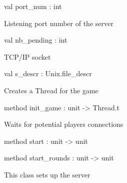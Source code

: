 \documentclass[11pt]{article}
\begin{document}
\begin{ocamldocobjectend}


\label{val:Server.server.port-underscorenum}\begin{ocamldoccode}
val port_num : int
\end{ocamldoccode}
\begin{ocamldocdescription}
Listening port number of the server


\end{ocamldocdescription}


\label{val:Server.server.nb-underscorepending}\begin{ocamldoccode}
val nb_pending : int
\end{ocamldoccode}
\begin{ocamldocdescription}
TCP/IP socket


\end{ocamldocdescription}


\label{val:Server.server.s-underscoredescr}\begin{ocamldoccode}
val s_descr : Unix.file_descr
\end{ocamldoccode}
\begin{ocamldocdescription}
Creates a Thread for the game


\end{ocamldocdescription}


\label{method:Server.server.init-underscoregame}\begin{ocamldoccode}
method init_game : unit -> Thread.t
\end{ocamldoccode}
\begin{ocamldocdescription}
Waits for potential players connections


\end{ocamldocdescription}


\label{method:Server.server.start}\begin{ocamldoccode}
method start : unit -> unit
\end{ocamldoccode}


\label{method:Server.server.start-underscorerounds}\begin{ocamldoccode}
method start_rounds : unit -> unit
\end{ocamldoccode}
\end{ocamldocobjectend}


\begin{ocamldocdescription}
This class sets up the server


\end{ocamldocdescription}
\end{document}
